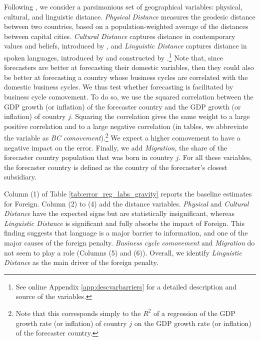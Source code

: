 Following \citet{Pellegrino2021}, we consider a parsimonious set of geographical variables: physical, cultural, and linguistic distance. \textit{Physical Distance} measures the geodesic distance between two countries, based on a population-weighted average of the distances between capital cities. \textit{Cultural Distance} captures distance in contemporary values and beliefs, introduced by \citet{Spolaore2016}, and \textit{Linguistic Distance} captures distance in spoken languages, introduced by \citet{Fearon2003} and constructed by \citet{Spolaore2016}.\footnote{See online Appendix \ref{app:descvarbarriers} for a detailed description and source of the variables.} Note that, since forecasters are better at forecasting their domestic variables, then they could also be better at forecasting a country whose business cycles are correlated with the domestic business cycles. We thus test whether forecasting is facilitated by business cycle comovement. To do so, we use the squared correlation between the GDP growth (or inflation) of the forecaster country and the GDP growth (or inflation) of country $j$. Squaring the correlation gives the same weight to a large positive correlation and to a large negative correlation (in tables, we abbreviate the variable as \textit{BC comovement}).\footnote{Note that this corresponds simply to the $R^2$ of a regression of the GDP growth rate (or inflation) of country $j$ on the GDP growth rate (or inflation) of the forecaster country.} We expect a higher comovement to have a negative impact on the error. Finally, we add \textit{Migration}, the share of the forecaster country population that was born in country $j$. For all these variables, the forecaster country is defined as the country of the forecaster's closest subsidiary.


\begin{landscape}
	\enlargethispage{2em}
	{
		
	}
\end{landscape}



Column (1) of Table \ref{tab:error_reg_labs_gravity} reports the baseline estimates for Foreign. Column (2) to (4) add the distance variables. \textit{Physical} and \textit{Cultural Distance} have the expected signs but are statistically insignificant, whereas \textit{Linguistic Distance} is significant and fully absorbs the impact of Foreign. This finding suggests that language is a major barrier to information, and one of the major causes of the foreign penalty. \textit{Business cycle comovement} and \textit{Migration} do not seem to play a role (Columns (5) and (6)). Overall, we identify \textit{Linguistic Distance} as the main driver of the foreign penalty.


